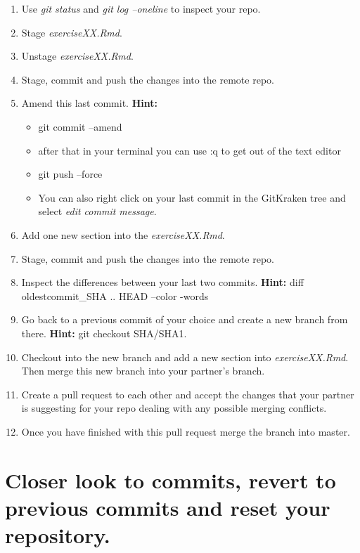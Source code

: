 \documentclass[
]{article}
\providecommand{\tightlist}{%
  \setlength{\itemsep}{0pt}\setlength{\parskip}{0pt}}
\begin{document}
\begin{enumerate}
\def\labelenumi{\arabic{enumi}.}
\setcounter{enumi}{11}
\item
  Use \emph{git status} and \emph{git log --oneline} to inspect your
  repo.
\item
  Stage \emph{exerciseXX.Rmd}.
\item
  Unstage \emph{exerciseXX.Rmd}.
\item
  Stage, commit and push the changes into the remote repo.
\item
  Amend this last commit. \textbf{Hint:}

  \begin{itemize}
  \tightlist
  \item
    git commit --amend
  \item
    after that in your terminal you can use :q to get out of the text
    editor
  \item
    git push --force
  \item
    You can also right click on your last commit in the GitKraken tree
    and select \emph{edit commit message}.
  \end{itemize}
\item
  Add one new section into the \emph{exerciseXX.Rmd}.
\item
  Stage, commit and push the changes into the remote repo.
\item
  Inspect the differences between your last two commits. \textbf{Hint:}
  diff oldestcommit\_SHA .. HEAD --color -words
\item
  Go back to a previous commit of your choice and create a new branch
  from there. \textbf{Hint:} git checkout SHA/SHA1.
\item
  Checkout into the new branch and add a new section into
  \emph{exerciseXX.Rmd}. Then merge this new branch into your partner's
  branch.
\item
  Create a pull request to each other and accept the changes that your
  partner is suggesting for your repo dealing with any possible merging
  conflicts.
\item
  Once you have finished with this pull request merge the branch into
  master.
\end{enumerate}

\hypertarget{closer-look-to-commits-revert-to-previous-commits-and-reset-your-repository.}{%
\section{Closer look to commits, revert to previous commits and reset
your
repository.}\label{closer-look-to-commits-revert-to-previous-commits-and-reset-your-repository.}}
\end{document}
